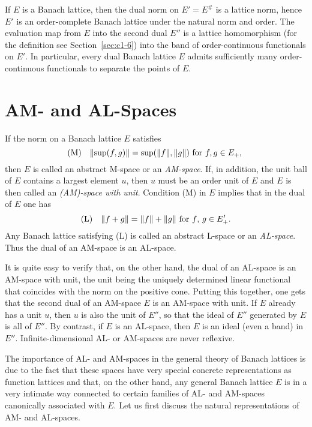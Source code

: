 If $ E $ is a Banach lattice, then the dual norm on $ E' = E^{\#} $ is a lattice norm, hence $ E' $ is an order-complete Banach lattice under the natural norm and order.
The evaluation map from $ E $ into the second dual $ E'' $ is a lattice homomorphism (for the definition see Section~\ref{sec:c1-6}) into the band of order-continuous functionals on $ E' $.
In particular, every dual Banach lattice $ E $ admits sufficiently many order-continuous functionals to separate the points of $ E $.
\section{AM- and AL-Spaces}\label{sec:c1-4}%
If the norm on a Banach lattice $ E $ satisfies
\begin{equation*}\label{eq:c1-2}
	\mathrm{(M)} \quad \lVert \sup(f,g) \rVert = \sup(\lVert f \rVert,\|g\|) \text{ for $ f, g \in E_{+}$, }  
\end{equation*}
then $ E $ is called an abstract M-space or an \emph{AM-space}.
If, in addition, the unit ball of $ E $ contains a largest element $ u $, then $ u $ must be an order unit of $ E $ and $ E $ is then called an \emph{(AM)-space with unit}.
Condition (M) in $ E $ implies that in the dual of $ E $ one has
\begin{equation*}\label{eq:c1-3}
	\mathrm{(L)} \quad \|f + g\| = \|f\| + \|g\| \text{ for $ f $, $ g \in E_{+}'$.} 
\end{equation*}
Any Banach lattice satisfying (L) is called an abstract L-space or an \emph{AL-space}.
Thus the dual of an AM-space is an AL-space.

It is quite easy to verify that, on the other hand, the dual of an AL-space is an AM-space with unit, the unit being the uniquely determined linear functional that coincides with the norm on the positive cone.
Putting this together, one gets that the second dual of an AM-space $ E $ is an AM-space with unit.
If $ E $ already has a unit $ u $, then $ u $ is also the unit of $ E'' $, so that the ideal of $ E'' $ generated by $ E $ is all of $ E'' $.
By contrast, if $ E $ is an AL-space, then $ E $ is an ideal (even a band) in $ E'' $.
Infinite-dimensional AL- or AM-spaces are never reflexive.

The importance of AL- and AM-spaces in the general theory of Banach lattices is due to the fact that these spaces have very special concrete representations as function lattices and that, on the other hand, any general Banach lattice $ E $ is in a very intimate way connected to certain families of AL- and AM-spaces canonically associated with $ E $.
Let us first discuss the natural representations of AM- and AL-spaces.

